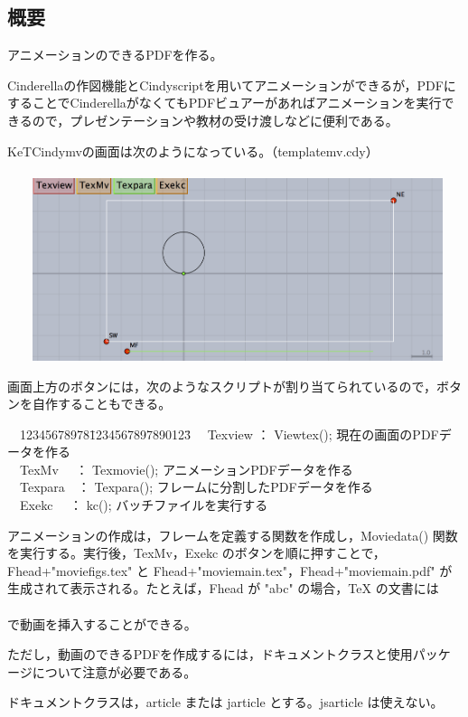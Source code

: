 \documentclass[papersize,a4paper,12pt,uplatex]{jsarticle}
\begin{document}
\subsection{概要}
アニメーションのできるPDFを作る。

Cinderellaの作図機能とCindyscriptを用いてアニメーションができるが，PDFにすることでCinderellaがなくてもPDFビュアーがあればアニメーションを実行できるので，プレゼンテーションや教材の受け渡しなどに便利である。

KeTCindymvの画面は次のようになっている。（templatemv.cdy）\\
　\\
　　\includegraphics[bb=0 0 1594 710 , width=12cm]{Figmv/mvgaiyou01.png}

画面上方のボタンには，次のようなスクリプトが割り当てられているので，ボタンを自作することもできる。

\begin{tabbing}
　12345678978\=1234567897890123\=\kill
　Texview  \>： Viewtex(); \>現在の画面のPDFデータを作る\\
　TexMv 　\>： Texmovie(); \>アニメーションPDFデータを作る\\
　Texpara　\>： Texpara(); \>フレームに分割したPDFデータを作る\\
　Exekc　 \>： kc(); \>バッチファイルを実行する
\end{tabbing}

アニメーションの作成は，フレームを定義する関数を作成し，Moviedata() 関数を実行する。実行後，TexMv，Exekc のボタンを順に押すことで，Fhead+"moviefigs.tex" と Fhead+"moviemain.tex"，Fhead+"moviemain.pdf" が生成されて表示される。たとえば，Fhead が "abc" の場合，TeX の文書には\\
 　　　　\verb||\\
で動画を挿入することができる。

ただし，動画のできるPDFを作成するには，ドキュメントクラスと使用パッケージについて注意が必要である。

ドキュメントクラスは，article または jarticle とする。jsarticle は使えない。
\end{document}
